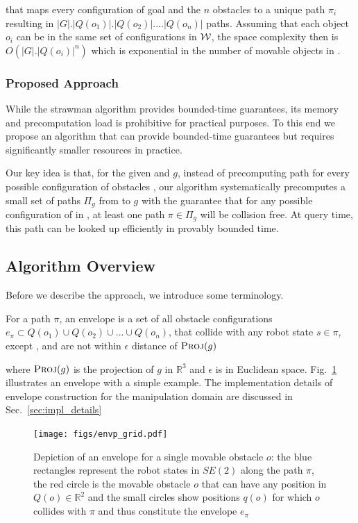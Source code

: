 \documentclass[a4paper]{report}
\begin{document}
\noindent that maps every configuration of goal and the $n$ obstacles to a unique path $\pi_i$ resulting in $|G|.|Q(o_1)|.|Q(o_2)|....|Q(o_n)|$ paths. Assuming that each object $o_i$ can be in the same set of configurations in $\mathcal{W}$, the space complexity then is $O(|G|.|Q(o_i)|^{n})$ which is exponential in the number of movable objects in \calO.

\subsubsection{Proposed Approach}
While the strawman algorithm provides bounded-time guarantees, its memory and precomputation load is prohibitive for practical purposes. To this end we propose an algorithm that can provide bounded-time guarantees but requires significantly smaller resources in practice.

Our key idea is that, for the given \Sstart and $g$, instead of precomputing path for every possible configuration of obstacles \calO, our algorithm systematically precomputes a small set of paths $\Pi_g$ from \Sstart to $g$ with the guarantee that for any possible configuration of \calO in \calW, at least one path $\pi \in \Pi_g$ will be collision free. At query time, this path can be looked up efficiently in provably bounded time.

\subsection{Algorithm Overview}
Before we describe the approach, we introduce some terminology.

\begin{definition}[Envelope]
\label{def:envp}
For a path $\pi$, an envelope is a set of all obstacle configurations $e_\pi \subset Q(o_1) \cup Q(o_2) \cup...\cup Q(o_n)$, that collide with any robot state $s \in \pi$, except \Sstart, and are not within $\epsilon$ distance of $\textsc{Proj}(g)$
\end{definition}

\noindent where $\textsc{Proj}(g)$ is the projection of $g$ in $\mathbb{R}^3$ and $\epsilon$ is in Euclidean space. Fig.~\ref{fig:envp} illustrates an envelope with a simple example.
The implementation details of envelope construction for the manipulation domain are discussed in Sec.~\ref{sec:impl_details}

\begin{figure}[bt]
\centering
\texttt{[image: figs/envp\_grid.pdf]}
\caption{Depiction of an envelope for a single movable obstacle $o$: the blue rectangles represent the robot states in $SE(2)$ along the path $\pi$, the red circle is the movable obstacle $o$ that can have any position in $Q(o) \in \mathbb{R}^2$ and the small circles show positions $q(o)$ for which $o$ collides with $\pi$ and thus constitute the envelope $e_\pi$}
\label{fig:envp}
\end{figure}
\end{document}
